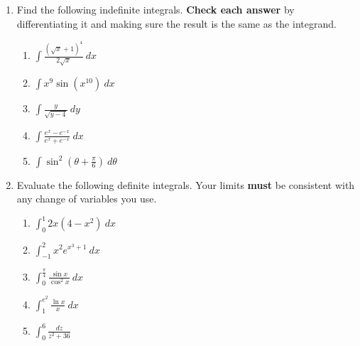 \documentclass[12pt,letterpaper]{article}
\begin{document}
\begin{enumerate}
\vspace{0.75pc}
\item Find the following indefinite integrals.  {\bf Check each answer} by differentiating it and making sure the result is the same as the integrand.

	\begin{enumerate}
	\item $\displaystyle\int \frac{\left(\sqrt{x}+1\right)^4}{2\sqrt{x}}\ dx$

	\vspace{0.75pc}
	\item $\displaystyle\int x^9\sin{(x^{10})}\ dx$

	\vspace{0.75pc}
	\item $\displaystyle\int \frac{y}{\sqrt{y-4}}\ dy$

	\vspace{0.75pc}
	\item $\displaystyle\int \frac{e^x-e^{-x}}{e^x+e^{-x}}\ dx$

	\vspace{0.75pc}
	\item $\displaystyle\int \sin^2{\left(\theta+\frac{\pi}{6}\right)}\ d\theta$
	\end{enumerate}

\vspace{1pc}
\item Evaluate the following definite integrals.  Your limits {\bf must} be consistent with any change of variables you use.

	\begin{enumerate}
	\item $\displaystyle\int_0^1 2x(4-x^2)\ dx$
	
	\vspace{0.75pc}
	\item $\displaystyle\int_{-1}^2 x^2e^{x^3+1}\ dx$
	
	\vspace{0.75pc}
	\item $\displaystyle\int_0^{\frac{\pi}{4}} \frac{\sin{x}}{\cos^2{x}}\ dx$
	
	\vspace{0.75pc}
	\item $\displaystyle\int_1^{e^2} \frac{\ln{x}}{x}\ dx$
	
	\vspace{0.75pc}
	\item $\displaystyle\int_0^6 \frac{dz}{z^2+36}$

	\end{enumerate}
	
\end{enumerate}
\end{document}
